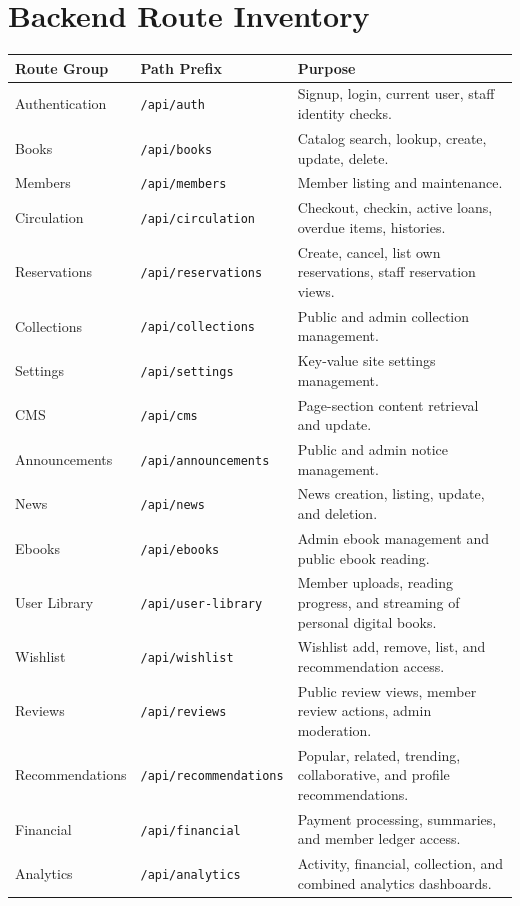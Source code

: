 \documentclass[12pt,a4paper]{report}
\begin{document}
\chapter{Backend Route Inventory}
\begin{longtable}{p{} p{} p{}}
\toprule
\textbf{Route Group} & \textbf{Path Prefix} & \textbf{Purpose} \\
\midrule
\endhead
Authentication & \texttt{/api/auth} & Signup, login, current user, staff identity checks. \\
Books & \texttt{/api/books} & Catalog search, lookup, create, update, delete. \\
Members & \texttt{/api/members} & Member listing and maintenance. \\
Circulation & \texttt{/api/circulation} & Checkout, checkin, active loans, overdue items, histories. \\
Reservations & \texttt{/api/reservations} & Create, cancel, list own reservations, staff reservation views. \\
Collections & \texttt{/api/collections} & Public and admin collection management. \\
Settings & \texttt{/api/settings} & Key-value site settings management. \\
CMS & \texttt{/api/cms} & Page-section content retrieval and update. \\
Announcements & \texttt{/api/announcements} & Public and admin notice management. \\
News & \texttt{/api/news} & News creation, listing, update, and deletion. \\
Ebooks & \texttt{/api/ebooks} & Admin ebook management and public ebook reading. \\
User Library & \texttt{/api/user-library} & Member uploads, reading progress, and streaming of personal digital books. \\
Wishlist & \texttt{/api/wishlist} & Wishlist add, remove, list, and recommendation access. \\
Reviews & \texttt{/api/reviews} & Public review views, member review actions, admin moderation. \\
Recommendations & \texttt{/api/recommendations} & Popular, related, trending, collaborative, and profile recommendations. \\
Financial & \texttt{/api/financial} & Payment processing, summaries, and member ledger access. \\
Analytics & \texttt{/api/analytics} & Activity, financial, collection, and combined analytics dashboards. \\

\end{longtable}
\end{document}
